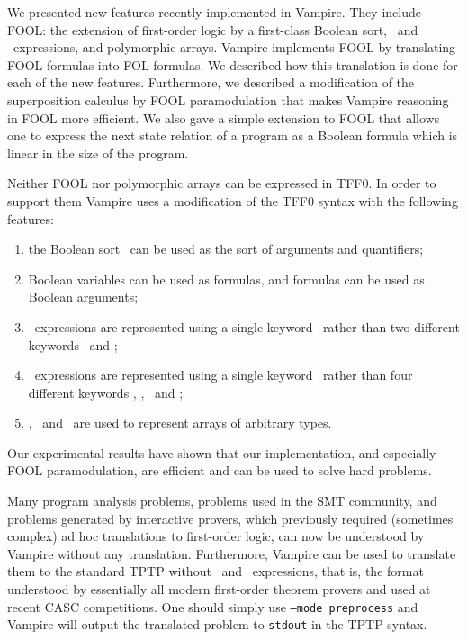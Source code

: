 We presented new features recently implemented in Vampire. They include FOOL: the extension of first-order logic by a first-class Boolean sort, \ITE\ and \LETIN\ expressions, and polymorphic arrays. Vampire implements FOOL by translating FOOL formulas into FOL formulas. We described how this translation is done for each of the new features. Furthermore, we described a modification of the superposition calculus by FOOL paramodulation that makes Vampire reasoning in FOOL more efficient. 
We also gave a simple extension to FOOL that allows one to express the next state relation of a program as a Boolean formula which is linear in the size of the program.

Neither FOOL nor polymorphic arrays can be expressed in TFF0. In order to support them Vampire uses a modification of the TFF0 syntax with the following features:

\begin{enumerate}
  \item the Boolean sort \tptpo\ can be used as the sort of arguments and quantifiers;
  \item Boolean variables can be used as formulas, and formulas can be used as Boolean arguments;
  \item \ITE\ expressions are represented using a single keyword \dite\ rather than two different keywords \ditet\ and \ditef;
  \item \LETIN\ expressions are represented using a single keyword \dlet\ rather than four different keywords \dlettt, \mbox{\dlettf,} \dletft\ and \dletff;
  \item \darraySymb, \dselect\ and \dstore\ are used to represent arrays of arbitrary types.
\end{enumerate}

Our experimental results have shown that our implementation, and especially FOOL paramodulation, are efficient and can be used to solve hard problems.

Many program analysis problems, problems used in the SMT community, and problems generated by interactive provers, which previously required (sometimes complex) ad hoc translations to first-order logic, can now be understood by Vampire without any translation. Furthermore, Vampire can be used to translate them to the standard TPTP without \ITE\ and \LETIN\ expressions, that is, the format understood by essentially all modern first-order theorem provers and used at recent CASC competitions. One should simply use \texttt{--mode preprocess} and Vampire will output the translated problem to \texttt{stdout} in the TPTP syntax. 

